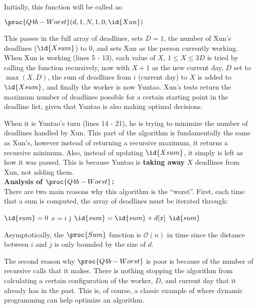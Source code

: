 Initially, this function will be called as:
\begin{center}
    $\proc{Q4b-Worst}(d, 1, N, 1, 0, \id{Xun})$
\end{center}
This passes in the full array of deadlines, sets $D = 1$, the number of Xun's deadlines ($\id{Xsum}$) to 0, and sets Xun as the person currently working.
When Xun is working (lines 5 - 13), each value of $X$, $1 \le X \le 3D$ is tried by calling the function recursively,
now with $X + 1$ as the new current day, $D$ set to $\max(X, D)$, the sum of deadlines from $i$ (current day) to $X$ is added to $\id{Xsum}$, and finally the worker is now Yuntao.
Xun's tests return the maximum number of deadlines possible for a certain starting point in the deadline list, given that Yuntao is also making optimal decisions.

When it is Yuntao's turn (lines 14 - 21), he is trying to minimize the number of deadlines handled by Xun.
This part of the algorithm is fundamentally the same as Xun's, however instead of returning a recursive maximum, it returns a recursive minimum.
Also, instead of updating $\id{Xsum}$, it simply is left as how it was passed. This is because Yuntao is \textbf{taking away} $X$ deadlines from Xun,
not adding them. \\


\textbf{Analysis of $\proc{Q4b-Worst}$:}\\
There are two main reasons why this algorithm is the ``worst''.
First, each time that a sum is computed, the array of deadlines must be iterated through:

\begin{spacing}{1.2}
    \begin{codebox}
        \li $\id{sum} = 0$
        \li \For $x = i$ \To j
        \Do
        \li $\id{sum} = \id{sum} + d[x]$
        \End
        \li \Return $\id{sum}$
    \end{codebox}
\end{spacing}
\vspace{5mm}
Asymptotically, the $\proc{Sum}$ function is $\mathcal{O}(n)$ in time since the distance between $i$ and $j$ is only bounded by the size of $d$.

The second reason why $\proc{Q4b-Worst}$ is poor is because of the number of recursive calls that it makes.
There is nothing stopping the algorithm from calculating a certain configuration of the worker, $D$, and current day that it already has in the past.
This is, of course, a classic example of where dynamic programming can help optimize an algorithm. \\

